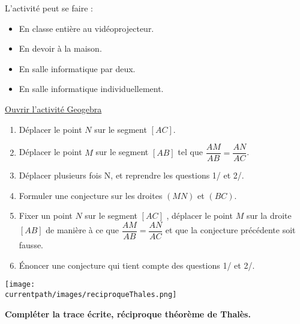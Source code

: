 \begin{activite}
    
        \begin{remarque}
            L'activité peut se faire :
            \begin{itemize}
                \item En classe entière au vidéoprojecteur.
                \item En devoir à la maison.
                \item En salle informatique par deux.
                \item En salle informatique individuellement.
            \end{itemize}
        \end{remarque}
        
        \href{https://www.geogebra.org/m/nztvwr9b}{ Ouvrir l'activité Geogebra}

        \begin{enumerate}
            \item Déplacer le point $N$ sur le segment $[AC]$.
            \item Déplacer le point $M$ sur le segment $[AB]$ tel que $\dfrac{AM}{AB}=\dfrac{AN}{AC}$.
            \item Déplacer plusieurs fois N, et reprendre les questions 1/ et 2/.
            \item Formuler une conjecture sur les droites $(MN)$ et $(BC)$.
            \item Fixer un point $N$ sur le segment $[AC]$ , déplacer le point $M$ sur la droite $[AB]$
            de manière à ce que $\dfrac{AM}{AB}=\dfrac{AN}{AC}$ et que la conjecture précédente soit fausse.
            \item Énoncer une conjecture qui tient compte des questions 1/ et 2/.
        \end{enumerate}

        \begin{center}
            \texttt{[image: \\currentpath/images/reciproqueThales.png]}
        \end{center}

        \textbf{Compléter la trace écrite, réciproque théorème de Thalès.}
\end{activite}